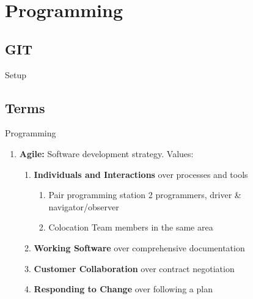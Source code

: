 \chapter{Programming}
\section{GIT}
	\begin{questions}{Setup}
		\begin{questionAnswer}
		\end{questionAnswer}
	\end{questions}

\section{Terms}
\begin{questions}{Programming}
	\begin{enumerate}
		\label{sect:agile}
		\item \textbf{Agile: } Software development strategy. Values:
			\begin{enumerate}
				\item \textbf{Individuals and Interactions} over processes and tools
					\begin{enumerate}
						\item Pair programming  station 2 programmers, driver \& navigator/observer
						\item Colocation \ra Team members in the same area
					\end{enumerate}
				\item \textbf{Working Software} over comprehensive documentation
				\item \textbf{Customer Collaboration} over contract negotiation
				\item \textbf{Responding to Change} over following a plan
			\end{enumerate}
	\end{enumerate}
\end{questions}


